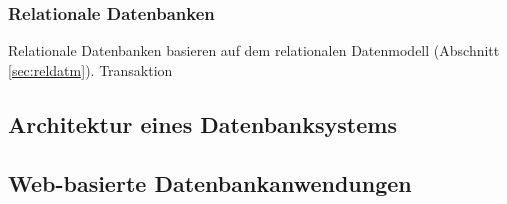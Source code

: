 \subsubsection*{Relationale Datenbanken \cite{skript}}
Relationale Datenbanken basieren auf dem relationalen Datenmodell (Abschnitt \ref{sec:reldatm}). 
\Gls{Transaktion}
\subsection{Architektur eines Datenbanksystems}
\subsection*{Web-basierte Datenbankanwendungen}

